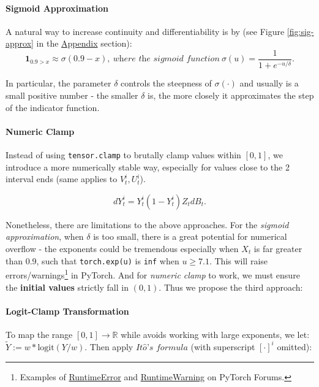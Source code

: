 \documentclass[a4paper,10pt]{article}
\newcommand{\1}{\mathbf{1}}
\begin{document}
\paragraph{Sigmoid Approximation} A natural way to increase continuity and differentiability is by (see Figure \ref{fig:sig-approx} in the \hyperlink{Algorithms}{Appendix} section):
\begin{equation}
    \1_{0.9>x} \approx \sigma(0.9-x), ~\textit{where the sigmoid function}~\sigma(u)=\frac{1}{1+e^{-u/\delta}}.
\end{equation}

In particular, the parameter \(\delta\) controls the steepness of
\(\sigma(\cdot)\) and usually is a small positive number - the smaller
\(\delta\) is, the more closely it approximates the step of the indicator function. 

\paragraph{Numeric Clamp} Instead of using \texttt{tensor.clamp} to brutally clamp values within \([0,1]\), we introduce a more numerically stable way, especially for values close to the 2 interval ends (same applies to \(V_t^i, U_t^i\)).

\begin{equation}\label{dY_tilde}
    dY_t^i=Y_t^i(1-Y_t^i)Z_tdB_t.
\end{equation}

Nonetheless, there are limitations to the above approaches. For the \textit{sigmoid approximation}, when \(\delta\) is too small, there is a great potential for numerical overflow - the exponents could be tremendous especially when \(X_t\) is far greater than 0.9, such that \texttt{torch.exp(u)} is \texttt{inf} when
$u \ge 7.1$. This will raise errors/warnings\footnote{Examples of
  \href{https://discuss.pytorch.org/t/second-order-derivative-with-nan-value-runtimeerror-function-sigmoidbackwardbackward0-returned-nan-values-in-its-0th-output/173260}{RuntimeError}
  and
  \href{https://discuss.pytorch.org/t/output-overflow-and-unstablity-when-use-model-eval/3668}{RuntimeWarning}
  on PyTorch Forums.} in PyTorch. And for \textit{numeric clamp} to work, we must ensure the \textbf{initial values} strictly fall in \((0,1)\). Thus we propose the third approach:

\paragraph{Logit-Clamp Transformation} To map the range $[0,1] \to \mathbb{R}$ while avoids working with large exponents, we let:
$\tilde{Y} := w*\text{logit} (Y/w)$. Then apply \(\textit{It}\hat{o} \textit{'s formula}\) (with
superscript \([\cdot]^i\) omitted):
\end{document}
